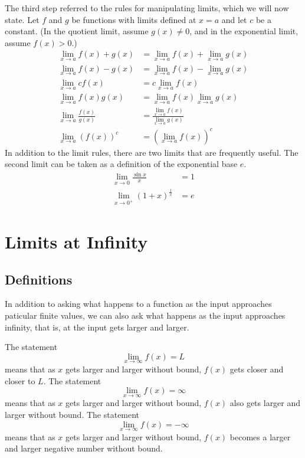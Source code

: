 \documentclass[fleqn]{report}
\begin{document}
The third step referred to the rules for manipulating limits,
which we will now state.
Let $f$ and $g$ be functions with limits defined at $x=a$ and
let $c$ be a constant. (In the quotient limit, assume $g(x)
\neq 0$, and in the exponential limit, assume $f(x) > 0$.)
\begin{align*}
\lim_{x \rightarrow a} f(x) + g(x) & = 
\lim_{x \rightarrow a} f(x) + 
\lim_{x \rightarrow a} g(x) \\
\lim_{x \rightarrow a} f(x) - g(x) & = 
\lim_{x \rightarrow a} f(x) - 
\lim_{x \rightarrow a} g(x) \\
\lim_{x \rightarrow a} c f(x) & = 
c \lim_{x \rightarrow a} f(x) \\
\lim_{x \rightarrow a} f(x) g(x) & = 
\lim_{x \rightarrow a} f(x) 
\lim_{x \rightarrow a} g(x) \\
\lim_{x \rightarrow a} \frac{f(x)}{g(x)} & = 
\frac{\lim_{x \rightarrow a} f(x)}
{\lim_{x \rightarrow a} g(x)} \\
\lim_{x \rightarrow a} (f(x))^c & = 
(\lim_{x \rightarrow a} f(x))^c 
\end{align*}
In addition to the limit rules, there are two limits that are
frequently useful.  The second limit can be taken as a
definition of the exponential base $e$. 
\begin{align*}
\lim_{x \rightarrow 0} \frac{\sin x}{x} & = 1 \\
\lim_{x \rightarrow 0^+} \left( 1 + x \right)^{\frac{1}{x}} & = e
\end{align*}

\section{Limits at Infinity}
\label{limits-at-infinity}

\subsection{Definitions}
\label{definitions-at-infinity}

In addition to asking what happens to a function as the input
approaches paticular finite values, we can also ask what
happens as the input approaches infinity, that is, at the
input gets larger and larger. 

The statement
\begin{equation*}
\lim_{x \rightarrow \infty} f(x) = L
\end{equation*}
means that as $x$ gets larger and larger without bound, $f(x)$
gets closer and closer to $L$. The statement
\begin{equation*}
\lim_{x \rightarrow \infty} f(x) = \infty
\end{equation*}
means that as $x$ gets larger and larger without bound, $f(x)$
also gets larger and larger without bound. The statement 
\begin{equation*}
\lim_{x \rightarrow \infty} f(x) = -\infty
\end{equation*}
means that as $x$ gets larger and larger without bound, $f(x)$
becomes a larger and larger negative number without bound.
\end{document}
